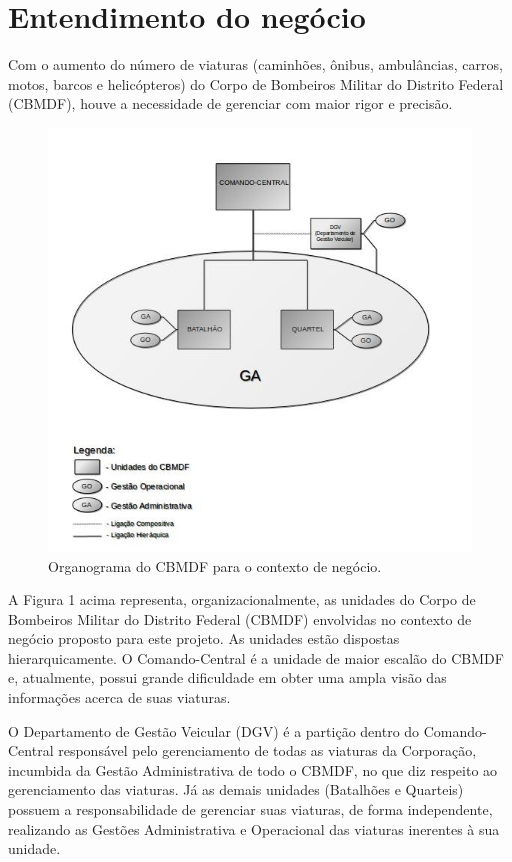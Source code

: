 \chapter{Entendimento do negócio}

  Com o aumento do número de viaturas (caminhões, ônibus, ambulâncias, carros, motos, barcos e helicópteros) do Corpo de 
  Bombeiros Militar do Distrito Federal (CBMDF), houve a necessidade de gerenciar com maior rigor e precisão.

  \begin{figure}[!htbp]
    \centering
    \includegraphics[scale=0.7, angle=0]{figuras/entendimento_negocio}
    \caption{Organograma do CBMDF para o contexto de negócio.}
  \end{figure}
  
  A Figura 1 acima representa, organizacionalmente, as unidades do Corpo de Bombeiros Militar do Distrito Federal (CBMDF)
  envolvidas no contexto de negócio proposto para este projeto. As unidades estão dispostas hierarquicamente. 
  O Comando-Central é a unidade de maior escalão do CBMDF e, atualmente, possui grande dificuldade em obter uma ampla 
  visão das informações acerca de suas viaturas.
  
  \pagebreak

  O Departamento de Gestão Veicular (DGV) é a partição dentro do Comando-Central responsável pelo gerenciamento de todas 
  as viaturas da Corporação, incumbida da Gestão Administrativa de todo o CBMDF, no que diz respeito ao gerenciamento das 
  viaturas. Já as demais unidades (Batalhões e Quarteis) possuem a responsabilidade de gerenciar suas viaturas, de forma 
  independente, realizando as Gestões Administrativa e Operacional das viaturas inerentes à sua unidade.
  

